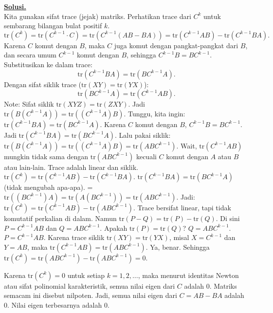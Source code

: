 \documentclass[12pt,twoside]{article}
\newenvironment{solution}
{
	\par\noindent\textbf{\underline{Solusi.}}\\
}
{
	\par
}
\begin{document}
\begin{enumerate}
\begin{solution}
          Kita gunakan sifat trace (jejak) matriks. Perhatikan trace dari $C^k$ untuk sembarang bilangan bulat positif $k$.
          \[ \text{tr}(C^k) = \text{tr}(C^{k-1} \cdot C) = \text{tr}(C^{k-1}(AB - BA)) = \text{tr}(C^{k-1}AB) - \text{tr}(C^{k-1}BA). \]
          Karena $C$ komut dengan $B$, maka $C$ juga komut dengan pangkat-pangkat dari $B$, dan secara umum $C^{k-1}$ komut dengan $B$, sehingga $C^{k-1} B = B C^{k-1}$.
          Substitusikan ke dalam trace:
          \[ \text{tr}(C^{k-1}BA) = \text{tr}(B C^{k-1} A). \]
          Dengan sifat siklik trace ($\text{tr}(XY) = \text{tr}(YX)$):
          \[ \text{tr}(B C^{k-1} A) = \text{tr}(C^{k-1} A B). \]
          Note: Sifat siklik $\text{tr}(XYZ) = \text{tr}(ZXY)$. Jadi $\text{tr}(B (C^{k-1} A)) = \text{tr}((C^{k-1} A) B)$.
          Tunggu, kita ingin:
          $\text{tr}(C^{k-1}BA) = \text{tr}(B C^{k-1} A)$.
          Karena $C$ komut dengan $B$, $C^{k-1} B = B C^{k-1}$.
          Jadi $\text{tr}(C^{k-1}BA) = \text{tr}(B C^{k-1} A)$.
          Lalu pakai siklik: $\text{tr}(B (C^{k-1} A)) = \text{tr}((C^{k-1} A) B) = \text{tr}(A B C^{k-1})$.
          Wait, $\text{tr}(C^{k-1} A B)$ mungkin tidak sama dengan $\text{tr}(A B C^{k-1})$ kecuali $C$ komut dengan $A$ atau $B$ atau lain-lain.
          Trace adalah linear dan siklik.
          $\text{tr}(C^k) = \text{tr}(C^{k-1} A B) - \text{tr}(C^{k-1} B A)$.
          $\text{tr}(C^{k-1} B A) = \text{tr}(B C^{k-1} A)$ (tidak mengubah apa-apa).
          = $\text{tr} ((B C^{k-1}) A) = \text{tr} (A (B C^{k-1})) = \text{tr} (A B C^{k-1})$.
          Jadi:
          $\text{tr}(C^k) = \text{tr}(C^{k-1} A B) - \text{tr}(A B C^{k-1})$.
          Trace bersifat linear, tapi tidak komutatif perkalian di dalam. Namun $\text{tr}(P - Q) = \text{tr}(P) - \text{tr}(Q)$.
          Di sini $P = C^{k-1} A B$ dan $Q = A B C^{k-1}$.
          Apakah $\text{tr}(P) = \text{tr}(Q)$?
          $Q = A B C^{k-1}$.
          $P = C^{k-1} A B$.
          Karena trace siklik $\text{tr}(XY) = \text{tr}(YX)$, misal $X = C^{k-1}$ dan $Y = AB$, maka $\text{tr}(C^{k-1} AB) = \text{tr}(AB C^{k-1})$.
          Ya, benar.
          Sehingga $\text{tr}(C^k) = \text{tr}(A B C^{k-1}) - \text{tr}(A B C^{k-1}) = 0$.

          Karena $\text{tr}(C^k) = 0$ untuk setiap $k=1, 2, \dots$, maka menurut identitas Newton atau sifat polinomial karakteristik, semua nilai eigen dari $C$ adalah 0.
          Matriks semacam ini disebut nilpoten.
          Jadi, semua nilai eigen dari $C = AB - BA$ adalah 0.
          Nilai eigen terbesarnya adalah 0.
        \end{solution}



\end{enumerate}
\end{document}
